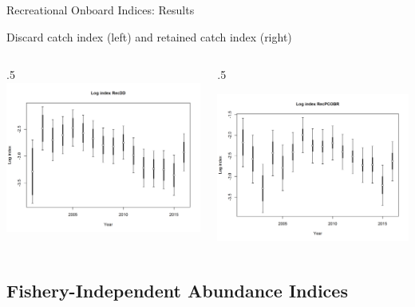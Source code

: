 \documentclass[ignorenonframetext,compress]{beamer}
\def\begincols{\begin{columns}}
\def\begincol{\begin{column}}
\def\endcol{\end{column}}
\def\endcols{\end{columns}}
\begin{document}
\begin{frame}{Recreational Onboard Indices: Results}

Discard catch index (left) and retained catch index (right) \begincols
 \begincol{.5\textwidth}
\includegraphics{r4ss/plots_mod1/index4_logcpuedata_RecDD.png}

\endcol
 \begincol{.5\textwidth}

\includegraphics{r4ss/plots_mod1/index4_logcpuedata_RecPCOBR.png}
\endcol
\endcols

\end{frame}

\subsection{Fishery-Independent Abundance
Indices}\label{fishery-independent-abundance-indices}
\end{document}
